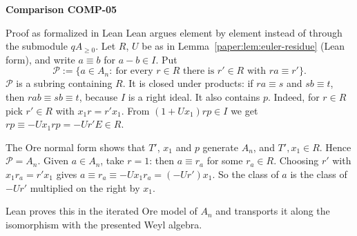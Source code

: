 \documentclass[11pt]{amsart}
\numberwithin{equation}{section}
\theoremstyle{plain}
\theoremstyle{remark}
\begin{document}
\par\bigskip\noindent{}\hypertarget{comparison-COMP-05}{\textbf{Comparison COMP-05}}\label{comparison-COMP-05}\par\smallskip
{}
\begin{AIaddition}{Proof as formalized in Lean}
Lean argues element by element instead of through the submodule
$qA_{\ge0}$. Let $R$, $U$ be as in Lemma~\ref{paper:lem:euler-residue} (Lean
form), and write $a\equiv b$ for $a-b\in I$. Put
\[
\mathcal P:=\{a\in A_n:\ \text{for every }r\in R\text{ there is }r'\in R
\text{ with } ra\equiv r'\}.
\]
$\mathcal P$ is a subring containing $R$. It is closed under products:
if $ra\equiv s$ and $sb\equiv t$, then $rab\equiv sb\equiv t$, because $I$ is
a right ideal. It also contains $p$. Indeed, for $r\in R$ pick $r'\in R$ with
$x_1r=r'x_1$. From $(1+Ux_1)rp\in I$ we get $rp\equiv-Ux_1rp=-Ur'E\in R$.

The Ore normal form shows that $T'$, $x_1$ and $p$ generate $A_n$, and
$T',x_1\in R$. Hence $\mathcal P=A_n$. Given $a\in A_n$, take $r=1$: then
$a\equiv r_a$ for some $r_a\in R$. Choosing $r'$ with $x_1r_a=r'x_1$ gives
$a\equiv r_a\equiv-Ux_1r_a=(-Ur')x_1$. So the class of $a$ is the class of
$-Ur'$ multiplied on the right by $x_1$.

Lean proves this in the iterated Ore model of $A_n$ and transports it along
the isomorphism with the presented Weyl algebra.
\end{AIaddition}
\end{document}

